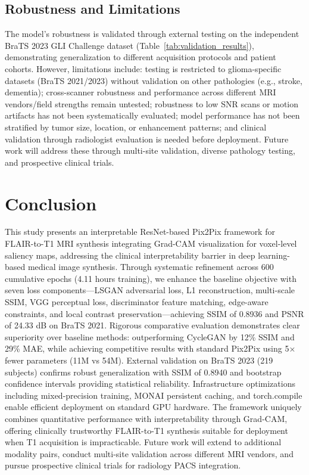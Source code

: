 \documentclass[runningheads]{llncs}
\begin{document}
\subsection{Robustness and Limitations}
\vspace{-0.2em}

The model's robustness is validated through external testing on the independent BraTS 2023 GLI Challenge dataset (Table~\ref{tab:validation_results}), demonstrating generalization to different acquisition protocols and patient cohorts. However, limitations include: testing is restricted to glioma-specific datasets (BraTS 2021/2023) without validation on other pathologies (e.g., stroke, dementia); cross-scanner robustness and performance across different MRI vendors/field strengths remain untested; robustness to low SNR scans or motion artifacts has not been systematically evaluated; model performance has not been stratified by tumor size, location, or enhancement patterns; and clinical validation through radiologist evaluation is needed before deployment. Future work will address these through multi-site validation, diverse pathology testing, and prospective clinical trials.


\section{Conclusion}
\vspace{-0.2em}

This study presents an interpretable ResNet-based Pix2Pix framework for FLAIR-to-T1 MRI synthesis integrating Grad-CAM visualization for voxel-level saliency maps, addressing the clinical interpretability barrier in deep learning-based medical image synthesis. Through systematic refinement across 600 cumulative epochs (4.11 hours training), we enhance the baseline objective with seven loss components—LSGAN adversarial loss, L1 reconstruction, multi-scale SSIM, VGG perceptual loss, discriminator feature matching, edge-aware constraints, and local contrast preservation—achieving SSIM of 0.8936 and PSNR of 24.33 dB on BraTS 2021. Rigorous comparative evaluation demonstrates clear superiority over baseline methods: outperforming CycleGAN by 12\% SSIM and 29\% MAE, while achieving competitive results with standard Pix2Pix using 5× fewer parameters (11M vs 54M). External validation on BraTS 2023 (219 subjects) confirms robust generalization with SSIM of 0.8940 and bootstrap confidence intervals providing statistical reliability. Infrastructure optimizations including mixed-precision training, MONAI persistent caching, and torch.compile enable efficient deployment on standard GPU hardware. The framework uniquely combines quantitative performance with interpretability through Grad-CAM, offering clinically trustworthy FLAIR-to-T1 synthesis suitable for deployment when T1 acquisition is impracticable. Future work will extend to additional modality pairs, conduct multi-site validation across different MRI vendors, and pursue prospective clinical trials for radiology PACS integration.
\end{document}
